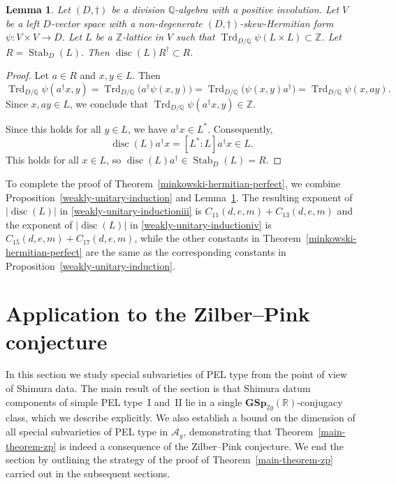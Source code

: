 \documentclass[11pt]{article}
\numberwithin{equation}{section}
\newcommand{\bQ}{\mathbb{Q}}
\newcommand{\bR}{\mathbb{R}}
\newcommand{\bZ}{\mathbb{Z}}
\newcommand{\Ag}{\mathcal{A}_g}
\newcommand{\gGSp}{\mathbf{GSp}}
\DeclareMathOperator{\disc}{disc}
\DeclareMathOperator{\Stab}{Stab}
\DeclareMathOperator{\Trd}{Trd}
\newcommand{\abs}[1]{\lvert #1 \rvert}
\newtheorem{lemma}{Lemma}[section]
\begin{document}
\begin{lemma} \label{R-cap-Rdag}
Let $(D,\dag)$ be a division $\bQ$-algebra with a positive involution.
Let $V$ be a left $D$-vector space with a non-degenerate $(D,\dag)$-skew-Hermitian form $\psi \colon V \times V \to D$.
Let $L$ be a $\bZ$-lattice in $V$ such that $\Trd_{D/\bQ} \psi(L \times L) \subset \bZ$.
Let $R = \Stab_D(L)$.
Then $\disc(L) R^\dag \subset R$.
\end{lemma}

\begin{proof}
Let $a \in R$ and $x, y \in L$.
Then
\[
\Trd_{D/\bQ} \psi(a^\dag x, y)
= \Trd_{D/\bQ} \bigl( a^\dag \psi(x,y) \bigr)
= \Trd_{D/\bQ} \bigl( \psi(x,y) a^\dag \bigr)
= \Trd_{D/\bQ} \psi(x,ay).
\]
Since $x, ay \in L$, we conclude that $\Trd_{D/\bQ} \psi(a^\dag x, y) \in \bZ$.

Since this holds for all $y \in L$, we have $a^\dag x \in L^*$.
Consequently,
\[
\disc(L)a^\dag x = [L^*:L]a^\dag x \in L.
\]
This holds for all $x \in L$, so $\disc(L)a^\dag \in \Stab_D(L) = R$.
\end{proof}

To complete the proof of Theorem~\ref{minkowski-hermitian-perfect}, we combine Proposition~\ref{weakly-unitary-induction} and Lemma~\ref{R-cap-Rdag}. The resulting expo\-nent of $\abs{\disc(L)}$ in \eqref{weakly-unitary-inductioniii} is $C_{11}(d,e,m)+C_{13}(d,e,m)$ and the exponent of $\abs{\disc(L)}$ in \eqref{weakly-unitary-inductioniv} is $C_{15}(d,e,m)+C_{17}(d,e,m)$, while the other constants in Theorem~\ref{minkowski-hermitian-perfect} are the same as the corresponding constants in Proposition~\ref{weakly-unitary-induction}.

\section{Application to the Zilber--Pink conjecture} \label{sec:ZP-high-level}

In this section we study special subvarieties of PEL type from the point of view of Shimura data.
The main result of the section is that Shimura datum components of simple PEL type~I and~II lie in a single $\gGSp_{2g}(\bR)$-conjugacy class, which we describe explicitly. We also establish a bound on the dimension of all special subvarieties of PEL type in $\Ag$, demonstrating that Theorem~\ref{main-theorem-zp} is indeed a consequence of the Zilber--Pink conjecture. We end the section by outlining the strategy of the proof of Theorem~\ref{main-theorem-zp} carried out in the subsequent sections.
\end{document}
